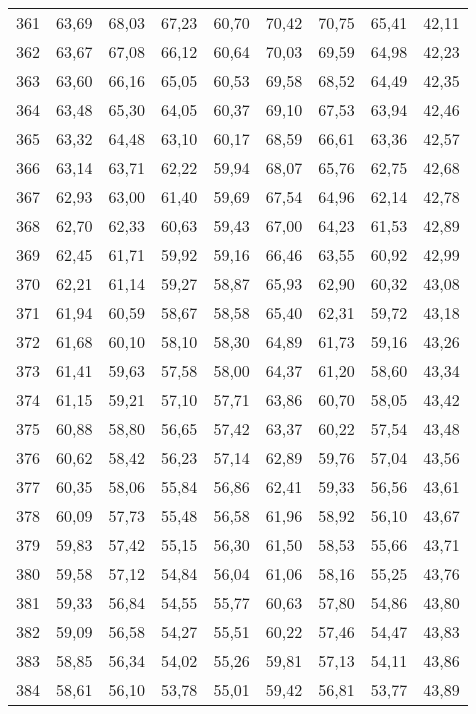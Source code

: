 \begin{longtable}{c c c c c c c c c}
361	& 63,69	& 68,03	& 67,23	& 60,70	& 70,42	& 70,75	& 65,41	& 42,11 \\
362	& 63,67	& 67,08	& 66,12	& 60,64	& 70,03	& 69,59	& 64,98	& 42,23 \\
363	& 63,60	& 66,16	& 65,05	& 60,53	& 69,58	& 68,52	& 64,49	& 42,35 \\
364	& 63,48	& 65,30	& 64,05	& 60,37	& 69,10	& 67,53	& 63,94	& 42,46 \\
365	& 63,32	& 64,48	& 63,10	& 60,17	& 68,59	& 66,61	& 63,36	& 42,57 \\
366	& 63,14	& 63,71	& 62,22	& 59,94	& 68,07	& 65,76	& 62,75	& 42,68 \\
367	& 62,93	& 63,00	& 61,40	& 59,69	& 67,54	& 64,96	& 62,14	& 42,78 \\
368	& 62,70	& 62,33	& 60,63	& 59,43	& 67,00	& 64,23	& 61,53	& 42,89 \\
369	& 62,45	& 61,71	& 59,92	& 59,16	& 66,46	& 63,55	& 60,92	& 42,99 \\
370	& 62,21	& 61,14	& 59,27	& 58,87	& 65,93	& 62,90	& 60,32	& 43,08 \\
371	& 61,94	& 60,59	& 58,67	& 58,58	& 65,40	& 62,31	& 59,72	& 43,18 \\
372	& 61,68	& 60,10	& 58,10	& 58,30	& 64,89	& 61,73	& 59,16	& 43,26 \\
373	& 61,41	& 59,63	& 57,58	& 58,00	& 64,37	& 61,20	& 58,60	& 43,34 \\
374	& 61,15	& 59,21	& 57,10	& 57,71	& 63,86	& 60,70	& 58,05	& 43,42 \\
375	& 60,88	& 58,80	& 56,65	& 57,42	& 63,37	& 60,22	& 57,54	& 43,48 \\
376	& 60,62	& 58,42	& 56,23	& 57,14	& 62,89	& 59,76	& 57,04	& 43,56 \\
377	& 60,35	& 58,06	& 55,84	& 56,86	& 62,41	& 59,33	& 56,56	& 43,61 \\
378	& 60,09	& 57,73	& 55,48	& 56,58	& 61,96	& 58,92	& 56,10	& 43,67 \\
379	& 59,83	& 57,42	& 55,15	& 56,30	& 61,50	& 58,53	& 55,66	& 43,71 \\
380	& 59,58	& 57,12	& 54,84	& 56,04	& 61,06	& 58,16	& 55,25	& 43,76 \\
381	& 59,33	& 56,84	& 54,55	& 55,77	& 60,63	& 57,80	& 54,86	& 43,80 \\
382	& 59,09	& 56,58	& 54,27	& 55,51	& 60,22	& 57,46	& 54,47	& 43,83 \\
383	& 58,85	& 56,34	& 54,02	& 55,26	& 59,81	& 57,13	& 54,11	& 43,86 \\
384	& 58,61	& 56,10	& 53,78	& 55,01	& 59,42	& 56,81	& 53,77	& 43,89 \\

\end{longtable}
